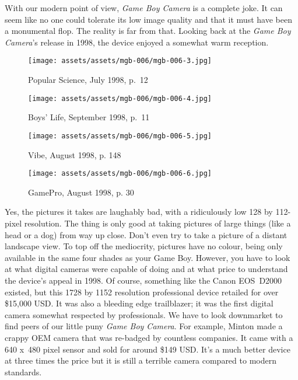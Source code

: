 \documentclass{book}
\begin{document}
With our modern point of view, \emph{Game Boy Camera} is a complete joke. It can seem like no one could tolerate its low image quality and that it must have been a monumental flop. The reality is far from that. Looking back at the \emph{Game Boy Camera}’s release in 1998, the device enjoyed a somewhat warm reception.

\begin{figure}[hbt]
\vskip 10pt
\centering \texttt{[image: assets/assets/mgb-006/mgb-006-3.jpg]}\par\pagetwodescription Popular Science, July 1998, p. 12
\vskip 6pt
\end{figure}
\begin{figure}[hbt]
\vskip 10pt
\centering \texttt{[image: assets/assets/mgb-006/mgb-006-4.jpg]}\par\pagetwodescription Boys’ Life, September 1998, p. 11
\vskip 6pt
\end{figure}
\begin{figure}[hbt]
\vskip 10pt
\centering \texttt{[image: assets/assets/mgb-006/mgb-006-5.jpg]}\par\pagetwodescription Vibe, August 1998, p. 148
\vskip 6pt
\end{figure}
\begin{figure}[hbt]
\vskip 10pt
\centering \texttt{[image: assets/assets/mgb-006/mgb-006-6.jpg]}\par\pagetwodescription GamePro, August 1998, p. 30
\vskip 6pt
\end{figure}

Yes, the pictures it takes are laughably bad, with a ridiculously low 128 by 112-pixel resolution. The thing is only good at taking pictures of large things (like a head or a dog) from way up close. Don’t even try to take a picture of a distant landscape view. To top off the mediocrity, pictures have no colour, being only available in the same four shades as your Game Boy. However, you have to look at what digital cameras were capable of doing and at what price to understand the device’s appeal in 1998. Of course, something like the Canon EOS D2000 existed, but this 1728 by 1152 resolution professional device retailed for over \$15,000 USD. It was also a bleeding edge trailblazer; it was the first digital camera somewhat respected by professionals. We have to look downmarket to find peers of our little puny \emph{Game Boy Camera}. For example, Minton made a crappy OEM camera that was re-badged by countless companies. It came with a 640 x 480 pixel sensor and sold for around \$149 USD. It’s a much better device at three times the price but it is still a terrible camera compared to modern standards.
\end{document}
